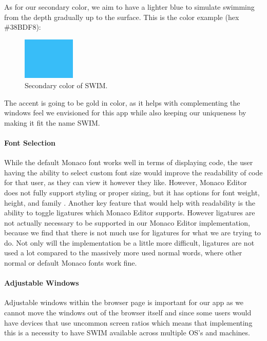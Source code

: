 \documentclass[
    paper=letter,
    parskip=half,
    fontsize=12pt,
    titlepage=firstiscover,
    toc=bibliography,
    numbers=endperiod
]{scrartcl}
\begin{document}
As for our secondary color, we aim to have a lighter blue to simulate
swimming from the depth gradually up to the surface. This is the color
example (hex \#38BDF8):

\begin{figure}[H]
    \includegraphics[height=2cm]{color-secondary}
    \caption{Secondary color of SWIM.}
\end{figure}

The accent is going to be gold in color, as it helps with complementing
the windows feel we envisioned for this app while also keeping our
uniqueness by making it fit the name SWIM.

\paragraph{Font Selection}

While the default Monaco font works well in terms of displaying code,
the user having the ability to select custom font size would improve the
readability of code for that user, as they can view it however they
like. However, Monaco Editor does not fully support styling or proper
sizing, but it has options for font weight, height, and family \cite{monaco-fontsize-issue}. Another
key feature that would help with readability is the ability to toggle
ligatures which Monaco Editor supports. However ligatures are not
actually necessary to be supported in our Monaco Editor implementation,
because we find that there is not much use for ligatures for what we are
trying to do. Not only will the implementation be a little more
difficult, ligatures are not used a lot compared to the massively more
used normal words, where other normal or default Monaco fonts work fine.

\paragraph{Adjustable Windows}

Adjustable windows within the browser page is important for our app as
we cannot move the windows out of the browser itself and since some
users would have devices that use uncommon screen ratios which means
that implementing this is a necessity to have SWIM available across
multiple OS's and machines.
\end{document}
